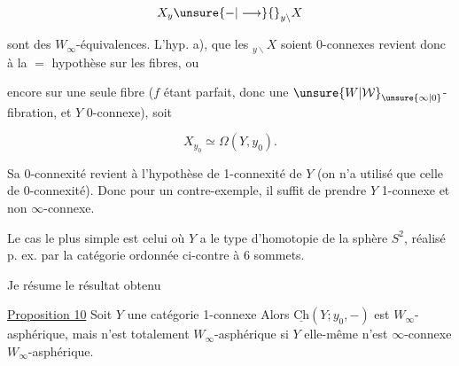 \[
X_y\unsure{-|\longrightarrow}{}_{y\backslash}X
\]

sont des $W_\infty$-équivalences. L'hyp. a), que les $ {}_{y\backslash}X$ soient 0-connexes revient donc à la $=$ hypothèse sur les fibres, ou

encore sur une seule fibre ($f$ étant parfait, donc une $\unsure{W|\mathcal W}_{\unsure{\infty|0}}$-fibration, et $Y$ 0-connexe), soit

\[
 X_{y_0}\simeq\Omega(Y,y_0).
\]

Sa 0-connexité revient à l'hypothèse de 1-connexité de $Y$ (on n'a utilisé  que celle de 0-connexité). Donc pour un contre-exemple, il suffit de prendre $Y$ 1-connexe et non $\infty$-connexe.

Le cas le plus simple est celui où $Y$ a le type d'homotopie de la sphère $S^2$, réalisé p. ex. par la catégorie ordonnée ci-contre à 6 sommets.




Je résume le résultat obtenu

\uline{Proposition 10} Soit $Y$ une  catégorie 1-connexe Alors $\underline{\mathrm{Ch}}(Y;y_0,-)$ est $W_\infty$-asphérique, mais n'est  totalement $W_\infty$-asphérique si $Y$ elle-même n'est $\infty$-connexe  $W_\infty$-asphérique.

